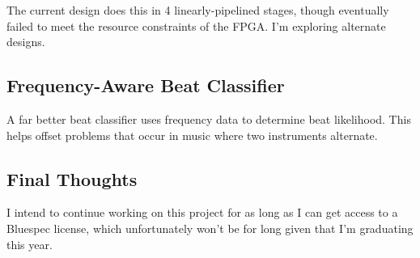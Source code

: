 \documentclass[letterpaper]{article}
\begin{document}
        The current design does this in 4 linearly-pipelined stages, though
        eventually failed to meet the resource constraints of the FPGA.  I'm
        exploring alternate designs.

    \subsection{Frequency-Aware Beat Classifier}

        A far better beat classifier uses frequency data to determine beat
        likelihood.  This helps offset problems that occur in music where two
        instruments alternate.

    \subsection{Final Thoughts}

        I intend to continue working on this project for as long as I can get
        access to a Bluespec license, which unfortunately won't be for long
        given that I'm graduating this year.
\end{document}

